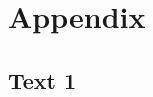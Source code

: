\documentclass[output=paper]{langsci/langscibook}
\begin{document}
% 
% 
% 
% 
% 
% 
% 
% 
% 
% 
% 
% 
% 
% 
% 
% 
% 
% 
% 
% 
% 
% 
% 
% 
% 
% 
% 
% 
% 
% 


\section{Appendix}

\subsection*{Text 1}
\end{document}
